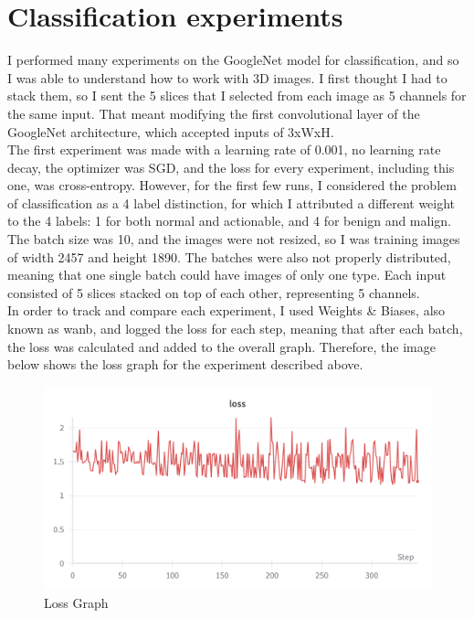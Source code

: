\section{Classification experiments}
I performed many experiments on the GoogleNet model for classification, and so I was able to understand how to work with 3D images. I first thought I had to stack them, so I sent the 5 slices that I selected from each image as 5 channels for the same input. That meant modifying the first convolutional layer of the GoogleNet architecture, which accepted inputs of 3xWxH.\\
The first experiment was made with a learning rate of 0.001, no learning rate decay, the optimizer was SGD, and the loss for every experiment, including this one, was cross-entropy. However, for the first few runs, I considered the problem of classification as a 4 label distinction, for which I attributed a different weight to the 4 labels: 1 for both normal and actionable, and 4 for benign and malign. The batch size was 10, and the images were not resized, so I was training images of width 2457 and height 1890. The batches were also not properly distributed, meaning that one single batch could have images of only one type. Each input consisted of 5 slices stacked on top of each other, representing 5 channels.\\
In order to track and compare each experiment, I used Weights \& Biases, also known as wanb, and logged the loss for each step, meaning that after each batch, the loss was calculated and added to the overall graph. Therefore, the image below shows the loss graph for the experiment described above.\\
\begin{figure}[!ht]
    \centering
    \includegraphics[width=1\textwidth]{figures/Figure8.png}
    \caption{Loss Graph}
    \label{fig:fig8}
\end{figure}
